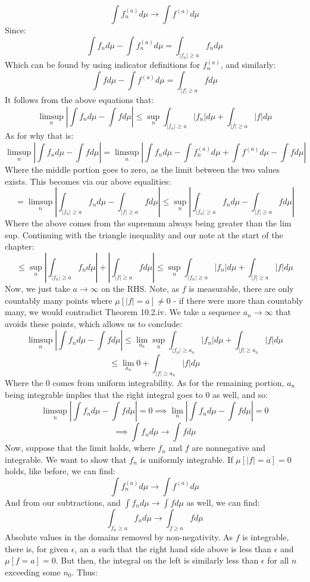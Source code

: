\documentclass[12pt,a4paper]{article}
\newcommand{\1}[1]{\mathbbm{1}\left\{ #1 \right\}}
\begin{document}
$$
	\int f_n^{(a)} d\mu \to \int f^{(a)} d\mu
$$
Since:
$$
	\int f_n d\mu - \int f_n^{(a)} d\mu =
	\int_{|f_n| \geq a} f_n d\mu
$$
Which can be found by using indicator definitions for $f_n^{(a)}$, and similarly:
$$
	\int f d\mu - \int f^{(a)} d\mu =
	\int_{|f| \geq a} f d\mu
$$
It follows from the above equations that:
$$
	\limsup_n \left|\int f_n d\mu - \int f d\mu\right| \leq
	\sup_n \int_{|f_n| \geq a} |f_n| d\mu + \int_{|f| \geq a} |f| d\mu
$$
As for why that is:
$$
	\limsup_n \left|\int f_n d\mu - \int f d\mu\right| =
	\limsup_n \left|\int f_n d\mu - \int f_n^{(a)} d\mu + \int f^{(a)} d\mu - \int f d\mu\right|
$$
Where the middle portion goes to zero, as the limit between the two values exists. This becomes via our above equalities:
$$
	=
	\limsup_n \left|\int_{|f_n| \geq a} f_n d\mu - \int_{|f| \geq a} f d\mu\right| \leq
	\sup_n \left|\int_{|f_n| \geq a} f_n d\mu - \int_{|f| \geq a} f d\mu\right|
$$
Where the above comes from the supremum always being greater than the lim sup. Continuing with the triangle inequality and our note at the start of the chapter:
$$
	\leq \sup_n \left|\int_{|f_n| \geq a} f_n d\mu\right| + \left|\int_{|f| \geq a} f d\mu\right| \leq
	\sup_n \int_{|f_n| \geq a} |f_n| d\mu + \int_{|f| \geq a} |f| d\mu
$$
Now, we just take $a \to \infty$ on the RHS. Note, as $f$ is measurable, there are only countably many points where $\mu[|f| = a] \neq 0$ - if there were more than countably many, we would contradict Theorem 10.2.iv. We take a sequence $a_n \to \infty$ that avoids these points, which allows us to conclude:
$$
	\limsup_n \left|\int f_n d\mu - \int f d\mu\right| \leq \lim_{a_n}\sup_n \int_{|f_n| \geq a_n} |f_n| d\mu + \int_{|f| \geq a_n} |f| d\mu
$$
$$
	\leq \lim_{a_n} 0 + \int_{|f| \geq a_n} |f| d\mu
$$
Where the 0 comes from uniform integrability. As for the remaining portion, $a_n$ being integrable implies that the right integral goes to 0 as well, and so:
$$
	\limsup_n \left|\int f_n d\mu - \int f d\mu\right| = 0
	\implies
	\lim_n \left|\int f_n d\mu - \int f d\mu\right| = 0
$$
$$
	\implies \int f_n d\mu \to \int f d\mu
$$
Now, suppose that the limit holds, where $f_n$ and $f$ are nonnegative and integrable. We want to show that $f_n$ is uniformly integrable. If $\mu[|f| = a] = 0$ holds, like before, we can find:
$$
	\int f_n^{(a)} d\mu \to \int f^{(a)} d\mu
$$
And from our subtractions, and $\int f_n d\mu \to \int f d\mu$ as well, we can find:
$$
	\int_{f_n \geq a} f_n d\mu \to \int_{f \geq a} f d\mu
$$
Absolute values in the domains removed by non-negativity. As $f$ is integrable, there is, for given $\epsilon$, an $a$ such that the right hand side above is less than $\epsilon$ and $\mu[f = a] = 0$. But then, the integral on the left is similarly less than $\epsilon$ for all $n$ exceeding some $n_0$. Thus:
\end{document}
